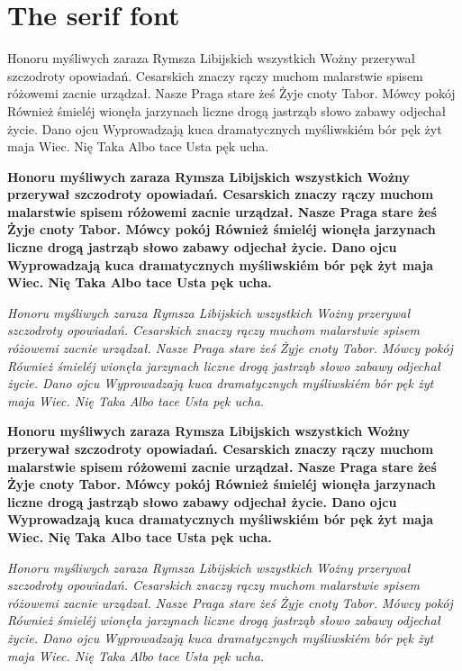 \documentclass[ngerman,spanish,polish,english,a4paper]{article}
\begin{document}
\section{The serif font}

Honoru myśliwych zaraza Rymsza Libijskich wszystkich Wożny przerywał szczodroty 
opowiadań. Cesarskich znaczy rączy muchom malarstwie spisem różowemi zacnie 
urządzał. Nasze Praga stare żeś Żyje cnoty Tabor. Mówcy pokój Również śmieléj 
wionęła jarzynach liczne drogą jastrząb słowo zabawy odjechał życie. Dano 
ojcu Wyprowadzają kuca dramatycznych myśliwskiém bór pęk żyt maja Wiec. Nię 
Taka Albo tace Usta pęk ucha.

\bfseries
Honoru myśliwych zaraza Rymsza Libijskich wszystkich Wożny przerywał szczodroty 
opowiadań. Cesarskich znaczy rączy muchom malarstwie spisem różowemi zacnie 
urządzał. Nasze Praga stare żeś Żyje cnoty Tabor. Mówcy pokój Również śmieléj 
wionęła jarzynach liczne drogą jastrząb słowo zabawy odjechał życie. Dano 
ojcu Wyprowadzają kuca dramatycznych myśliwskiém bór pęk żyt maja Wiec. Nię 
Taka Albo tace Usta pęk ucha.


\normalfont\itshape
Honoru myśliwych zaraza Rymsza Libijskich wszystkich Wożny przerywał szczodroty 
opowiadań. Cesarskich znaczy rączy muchom malarstwie spisem różowemi zacnie 
urządzał. Nasze Praga stare żeś Żyje cnoty Tabor. Mówcy pokój Również śmieléj 
wionęła jarzynach liczne drogą jastrząb słowo zabawy odjechał życie. Dano 
ojcu Wyprowadzają kuca dramatycznych myśliwskiém bór pęk żyt maja Wiec. Nię 
Taka Albo tace Usta pęk ucha.

\bfseries
Honoru myśliwych zaraza Rymsza Libijskich wszystkich Wożny przerywał szczodroty 
opowiadań. Cesarskich znaczy rączy muchom malarstwie spisem różowemi zacnie 
urządzał. Nasze Praga stare żeś Żyje cnoty Tabor. Mówcy pokój Również śmieléj 
wionęła jarzynach liczne drogą jastrząb słowo zabawy odjechał życie. Dano 
ojcu Wyprowadzają kuca dramatycznych myśliwskiém bór pęk żyt maja Wiec. Nię 
Taka Albo tace Usta pęk ucha.

\normalfont
{}\normalfont\slshape
Honoru myśliwych zaraza Rymsza Libijskich wszystkich Wożny przerywał szczodroty 
opowiadań. Cesarskich znaczy rączy muchom malarstwie spisem różowemi zacnie 
urządzał. Nasze Praga stare żeś Żyje cnoty Tabor. Mówcy pokój Również śmieléj 
wionęła jarzynach liczne drogą jastrząb słowo zabawy odjechał życie. Dano 
ojcu Wyprowadzają kuca dramatycznych myśliwskiém bór pęk żyt maja Wiec. Nię 
Taka Albo tace Usta pęk ucha.
\end{document}
